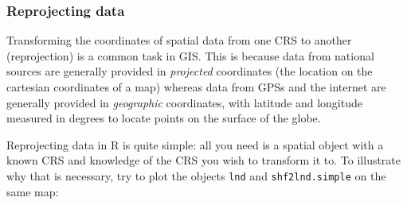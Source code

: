 \documentclass[]{article}
\begin{document}
\subsubsection{Reprojecting data}

Transforming the coordinates of spatial data from one CRS to another
(reprojection) is a common task in GIS. This is because data from
national sources are generally provided in \emph{projected} coordinates
(the location on the cartesian coordinates of a map) whereas data from
GPSs and the internet are generally provided in \emph{geographic}
coordinates, with latitude and longitude measured in degrees to locate
points on the surface of the globe.

Reprojecting data in R is quite simple: all you need is a spatial object
with a known CRS and knowledge of the CRS you wish to transform it to.
To illustrate why that is necessary, try to plot the objects
\texttt{lnd} and \texttt{shf2lnd.simple} on the same map:
\end{document}
